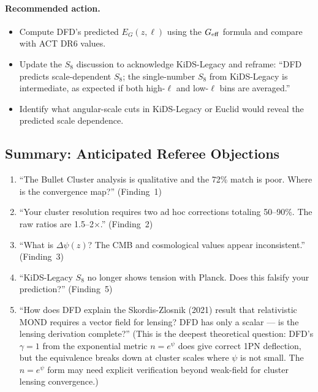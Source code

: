 \paragraph{Recommended action.}
\begin{itemize}
\item Compute DFD's predicted $E_G(z, \ell)$ using the $G_{\rm eff}$
  formula and compare with ACT DR6 values.
\item Update the $S_8$ discussion to acknowledge KiDS-Legacy and
  reframe: ``DFD predicts scale-dependent $S_8$; the single-number
  $S_8$ from KiDS-Legacy is intermediate, as expected if both
  high-$\ell$ and low-$\ell$ bins are averaged.''
\item Identify what angular-scale cuts in KiDS-Legacy or Euclid
  would reveal the predicted scale dependence.
\end{itemize}

\subsection*{Summary: Anticipated Referee Objections}

\begin{enumerate}
\item ``The Bullet Cluster analysis is qualitative and the 72\% match is
  poor.  Where is the convergence map?'' (Finding~1)
\item ``Your cluster resolution requires two ad hoc corrections totaling
  50--90\%.  The raw ratios are 1.5--2$\times$.'' (Finding~2)
\item ``What is $\Delta\psi(z)$?  The CMB and cosmological values appear
  inconsistent.'' (Finding~3)
\item ``KiDS-Legacy $S_8$ no longer shows tension with Planck.  Does this
  falsify your prediction?'' (Finding~5)
\item ``How does DFD explain the Skordis-Zlosnik (2021) result that
  relativistic MOND requires a vector field for lensing?  DFD has only
  a scalar --- is the lensing derivation complete?'' (This is the
  deepest theoretical question: DFD's $\gamma = 1$ from the
  exponential metric $n = e^\psi$ does give correct 1PN deflection,
  but the equivalence breaks down at cluster scales where $\psi$ is
  not small.  The $n = e^\psi$ form may need explicit verification
  beyond weak-field for cluster lensing convergence.)
\end{enumerate}

